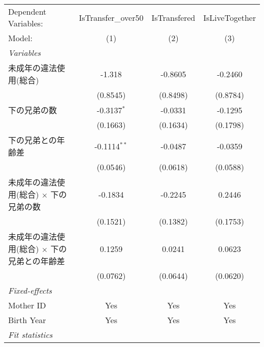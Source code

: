 \documentclass{article}
\begin{document}
\begin{landscape}


\begingroup
\centering
\begin{threeparttable}[b]
   \begin{tabular}{lccc}
      \tabularnewline \midrule \midrule
      Dependent Variables:                                & IsTransfer\_over50  & IsTransfered & IsLiveTogether\\  
      Model:                                              & (1)                 & (2)          & (3)\\  
      \midrule
      \emph{Variables}\\
      未成年の違法使用(総合)                              & -1.318              & -0.8605      & -0.2460\\   
                                                          & (0.8545)            & (0.8498)     & (0.8784)\\   
      下の兄弟の数                                        & -0.3137$^{*}$       & -0.0331      & -0.1295\\   
                                                          & (0.1663)            & (0.1634)     & (0.1798)\\   
      下の兄弟との年齢差                                  & -0.1114$^{**}$      & -0.0487      & -0.0359\\   
                                                          & (0.0546)            & (0.0618)     & (0.0588)\\   
      未成年の違法使用(総合) $\times$ 下の兄弟の数        & -0.1834             & -0.2245      & 0.2446\\   
                                                          & (0.1521)            & (0.1382)     & (0.1753)\\   
      未成年の違法使用(総合) $\times$ 下の兄弟との年齢差  & 0.1259              & 0.0241       & 0.0623\\   
                                                          & (0.0762)            & (0.0644)     & (0.0620)\\   
      \midrule
      \emph{Fixed-effects}\\
      Mother ID                                           & Yes                 & Yes          & Yes\\  
      Birth Year                                          & Yes                 & Yes          & Yes\\  
      \midrule
      \emph{Fit statistics}\\

\end{tabular}
\end{threeparttable}
\end{landscape}
\end{document}
